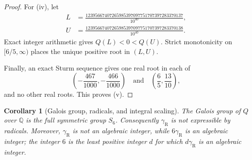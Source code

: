 \documentclass[11pt]{article}
\newtheorem{corollary}[theorem]{Corollary}
\theoremstyle{remark}
\newcommand{\gR}{\gamma_{\mathrm R}}
\begin{document}
\begin{proof}
For (iv), let
\begin{align*}
L&=\frac{12395667407265985397097751707397283370137}{10^{40}},\\
U&=\frac{12395667407265985397097751707397283370138}{10^{40}}.
\end{align*}
Exact integer arithmetic gives \(Q(L)<0<Q(U)\). Strict monotonicity on \([6/5,\infty)\) places the unique positive root in \((L,U)\).

Finally, an exact Sturm sequence gives one real root in each of
\[
\left(-\frac{467}{1000},-\frac{466}{1000}\right)
\quad\text{and}\quad
\left(\frac65,\frac{13}{10}\right),
\]
and no other real roots. This proves (v).
\end{proof}

\begin{corollary}[Galois group, radicals, and integral scaling]\label{cor:galois}
The Galois group of \(Q\) over \(\mathbb Q\) is the full symmetric group \(S_6\). Consequently \(\gR\) is not expressible by radicals. Moreover, \(\gR\) is not an algebraic integer, while \(6\gR\) is an algebraic integer; the integer \(6\) is the least positive integer \(d\) for which \(d\gR\) is an algebraic integer.
\end{corollary}
\end{document}
